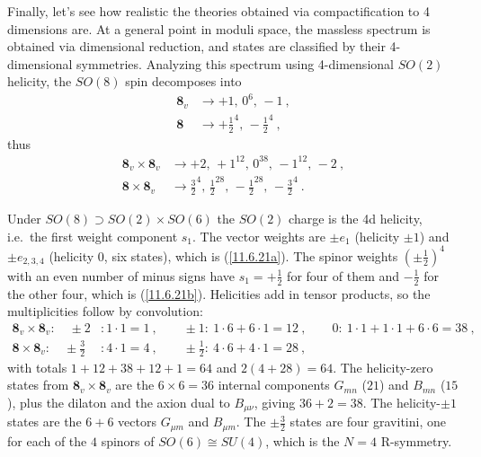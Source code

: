 Finally, let's see how realistic the theories obtained via compactification to 4 dimensions are. At a general point in moduli space, the massless spectrum is obtained via dimensional reduction, and states are classified by their 4-dimensional symmetries. Analyzing this spectrum using 4-dimensional $SO(2)$ helicity, the $SO(8)$ spin decomposes into
\begin{subequations}
	\begin{align}
		\mathbf{8}_{v} &\to +1,\,0^{6},\,-1\:, \label{11.6.21a}  \\
		\mathbf{8} &\to +\tfrac{1}{2}^{4},\,-\tfrac{1}{2}^{4} \:, \label{11.6.21b}
	\end{align}
\end{subequations}  
thus
\begin{subequations}
	\begin{align}
		\mathbf{8}_{v}\times\mathbf{8}_{v} &\to +2,\,+1^{12},\,0^{38},\,-1^{12},\,-2\:, \label{11.6.22a} \\
		\mathbf{8}\times \mathbf{8}_{v} &\to \tfrac{3}{2}^{4},\,\tfrac{1}{2}^{28},\,-\tfrac{1}{2}^{28},\,-\tfrac{3}{2}^{4} \:. \label{11.6.22b}
	\end{align}
\end{subequations}
\begin{tcolorbox}[breakable]
	\begin{remark}
		Under $SO(8)\supset SO(2)\times SO(6)$ the $SO(2)$ charge is the 4d helicity, i.e.\ the first weight component $s_{1}$. The vector weights are $\pm e_{1}$ (helicity $\pm1$) and $\pm e_{2,3,4}$ (helicity 0, six states), which is (\ref{11.6.21a}). The spinor weights $(\pm\frac{1}{2})^{4}$ with an even number of minus signs have $s_{1}=+\frac{1}{2}$ for four of them and $-\frac{1}{2}$ for the other four, which is (\ref{11.6.21b}). Helicities add in tensor products, so the multiplicities follow by convolution:
		\begin{align*}
			\mathbf{8}_{v}\times\mathbf{8}_{v}:\quad \pm2&:1\cdot1=1\:,\qquad \pm1:\ 1\cdot6+6\cdot1=12\:,\qquad 0:\ 1\cdot1+1\cdot1+6\cdot6=38\:,\\
			\mathbf{8}\times\mathbf{8}_{v}:\quad \pm\tfrac{3}{2}&:4\cdot1=4\:,\qquad \pm\tfrac{1}{2}:\ 4\cdot6+4\cdot1=28\:,
		\end{align*}
		with totals $1+12+38+12+1=64$ and $2(4+28)=64$. The helicity-zero states from $\mathbf{8}_{v}\times\mathbf{8}_{v}$ are the $6\times6=36$ internal components $G_{mn}$ ($21$) and $B_{mn}$ ($15$), plus the dilaton and the axion dual to $B_{\mu\nu}$, giving $36+2=38$. The helicity-$\pm1$ states are the $6+6$ vectors $G_{\mu m}$ and $B_{\mu m}$. The $\pm\frac{3}{2}$ states are four gravitini, one for each of the $4$ spinors of $SO(6)\cong SU(4)$, which is the $N=4$ R-symmetry.
	\end{remark}
\end{tcolorbox}
